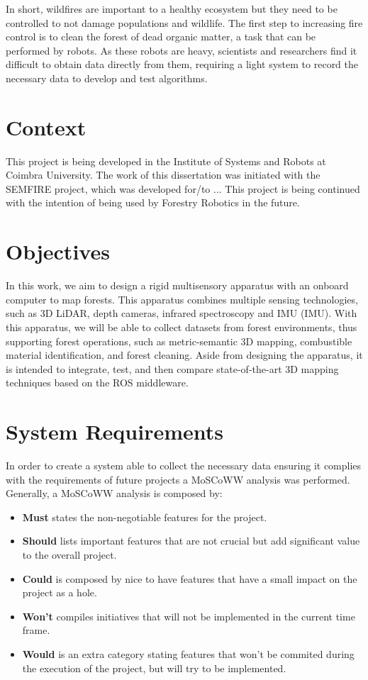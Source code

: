 In short, wildfires are important to a healthy ecosystem but they need to be controlled to not damage populations and wildlife. The first step to increasing fire control is to clean the forest of dead organic matter, a task that can be performed by robots. As these robots are heavy, scientists and researchers find it difficult to obtain data directly from them, requiring a light system to record the necessary data to develop and test algorithms.

\section{Context}

This project is being developed in the Institute of Systems and Robots at Coimbra University. The work of this dissertation was initiated with the SEMFIRE project, which was developed for/to ... This project is being continued with the intention of being used by Forestry Robotics in the future.

\section{Objectives}
In this work, we aim to design a rigid multisensory apparatus with an onboard computer to map forests. This apparatus combines multiple sensing technologies, such as 3D \acs{LiDAR}, depth cameras, infrared spectroscopy and \acl{IMU} (\acs{IMU}). With this apparatus, we will be able to collect datasets from forest environments, thus supporting forest operations, such as metric-semantic 3D mapping, combustible material identification, and forest cleaning. Aside from designing the apparatus, it is intended to integrate, test, and then compare state-of-the-art 3D mapping techniques based on the ROS middleware.

\section{System Requirements}

In order to create a system able to collect the necessary data ensuring it complies with the requirements of future projects a MoSCoWW analysis was performed. Generally, a MoSCoWW analysis is composed by:

\begin{itemize}
    \item \textbf{Must} states the non-negotiable features for the project.
    \item \textbf{Should} lists important features that are not crucial but add significant value to the overall project.
    \item \textbf{Could} is composed by nice to have features that have a small impact on the project as a hole.
    \item \textbf{Won't} compiles initiatives that will not be implemented in the current time frame.
    \item \textbf{Would} is an extra category stating features that won't be commited during the execution of the project, but will try to be implemented.
\end{itemize}

